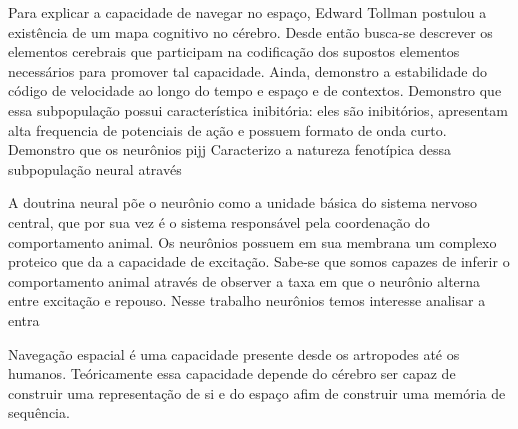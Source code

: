 %
%



Para explicar a capacidade de navegar no espaço, Edward Tollman postulou a existência de um mapa cognitivo no cérebro.
Desde então busca-se descrever os elementos cerebrais que participam na codificação dos supostos elementos necessários para promover tal capacidade.
Ainda, demonstro a estabilidade do código de velocidade ao longo do tempo e espaço e de contextos.
Demonstro que essa subpopulação possui característica inibitória: eles são inibitórios, apresentam alta frequencia de potenciais de ação e possuem formato de onda curto.
Demonstro que os neurônios pijj 
Caracterizo a natureza fenotípica dessa subpopulação neural através    




A doutrina neural põe o neurônio como a unidade básica do sistema nervoso central, que por sua vez é o sistema responsável pela coordenação do comportamento animal. Os neurônios possuem em sua membrana um complexo proteico que da a capacidade de excitação. Sabe-se que somos capazes de inferir o comportamento animal através de observer a taxa em que o neurônio alterna entre excitação e repouso. Nesse trabalho neurônios temos interesse analisar a entra

Navegação espacial é uma capacidade presente desde os artropodes até os humanos.
Teóricamente essa capacidade depende do cérebro ser capaz de construir uma representação de si e do espaço afim de construir uma memória de sequência.


